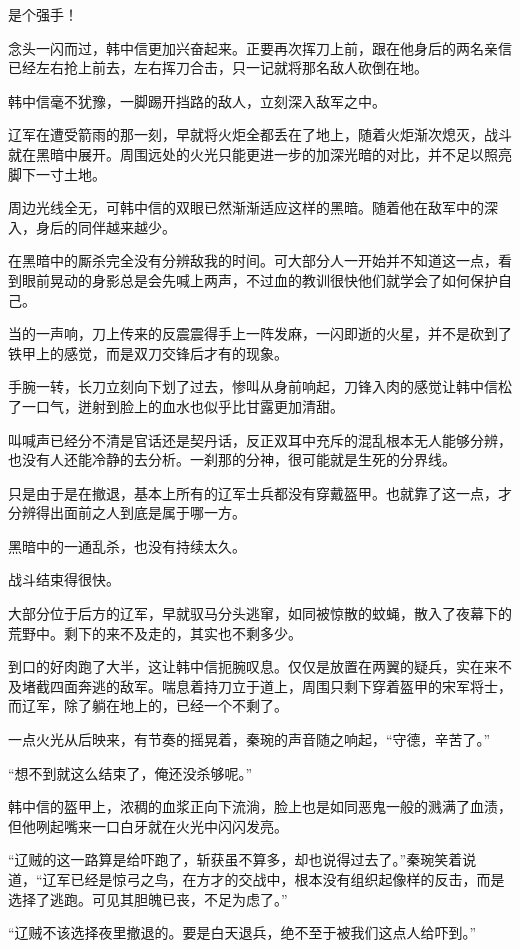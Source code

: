 是个强手！

念头一闪而过，韩中信更加兴奋起来。正要再次挥刀上前，跟在他身后的两名亲信已经左右抢上前去，左右挥刀合击，只一记就将那名敌人砍倒在地。

韩中信毫不犹豫，一脚踢开挡路的敌人，立刻深入敌军之中。

辽军在遭受箭雨的那一刻，早就将火炬全都丢在了地上，随着火炬渐次熄灭，战斗就在黑暗中展开。周围远处的火光只能更进一步的加深光暗的对比，并不足以照亮脚下一寸土地。

周边光线全无，可韩中信的双眼已然渐渐适应这样的黑暗。随着他在敌军中的深入，身后的同伴越来越少。

在黑暗中的厮杀完全没有分辨敌我的时间。可大部分人一开始并不知道这一点，看到眼前晃动的身影总是会先喊上两声，不过血的教训很快他们就学会了如何保护自己。

当的一声响，刀上传来的反震震得手上一阵发麻，一闪即逝的火星，并不是砍到了铁甲上的感觉，而是双刀交锋后才有的现象。

手腕一转，长刀立刻向下划了过去，惨叫从身前响起，刀锋入肉的感觉让韩中信松了一口气，迸射到脸上的血水也似乎比甘露更加清甜。

叫喊声已经分不清是官话还是契丹话，反正双耳中充斥的混乱根本无人能够分辨，也没有人还能冷静的去分析。一刹那的分神，很可能就是生死的分界线。

只是由于是在撤退，基本上所有的辽军士兵都没有穿戴盔甲。也就靠了这一点，才分辨得出面前之人到底是属于哪一方。

黑暗中的一通乱杀，也没有持续太久。

战斗结束得很快。

大部分位于后方的辽军，早就驭马分头逃窜，如同被惊散的蚊蝇，散入了夜幕下的荒野中。剩下的来不及走的，其实也不剩多少。

到口的好肉跑了大半，这让韩中信扼腕叹息。仅仅是放置在两翼的疑兵，实在来不及堵截四面奔逃的敌军。喘息着持刀立于道上，周围只剩下穿着盔甲的宋军将士，而辽军，除了躺在地上的，已经一个不剩了。

一点火光从后映来，有节奏的摇晃着，秦琬的声音随之响起，“守德，辛苦了。”

“想不到就这么结束了，俺还没杀够呢。”

韩中信的盔甲上，浓稠的血浆正向下流淌，脸上也是如同恶鬼一般的溅满了血渍，但他咧起嘴来一口白牙就在火光中闪闪发亮。

“辽贼的这一路算是给吓跑了，斩获虽不算多，却也说得过去了。”秦琬笑着说道，“辽军已经是惊弓之鸟，在方才的交战中，根本没有组织起像样的反击，而是选择了逃跑。可见其胆魄已丧，不足为虑了。”

“辽贼不该选择夜里撤退的。要是白天退兵，绝不至于被我们这点人给吓到。”

